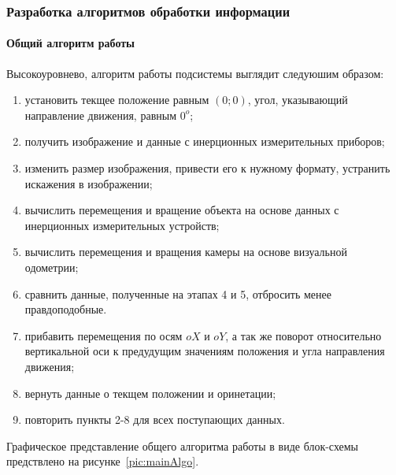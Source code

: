 \subsubsection{Разработка алгоритмов обработки информации}
\paragraph{Общий алгоритм работы}

Высокоуровнево, алгоритм работы подсистемы выглядит следуюшим образом:
\begin{enumerate}
\item установить текщее положение равным $(0; 0)$, угол, указывающий направление движения, равным $0^{o}$;
\item получить изображение и данные с инерционных измерительных приборов;
\item изменить размер изображения, привести его к нужному формату, устранить искажения в изображении;
\item вычислить перемещения и вращение объекта на основе данных с инерционных измерительных устройств;
\item вычислить перемещения и вращения камеры на основе визуальной одометрии;
\item сравнить данные, полученные на этапах 4 и 5, отбросить менее правдоподобные.
\item прибавить перемещения по осям $oX$ и $oY$, а так же поворот относительно вертикальной оси к предудущим значениям положения и угла направления движения;
\item вернуть данные о текщем положении и оринетации;
\item повторить пункты 2-8 для всех поступающих данных.
\end{enumerate}

Графическое представление общего алгоритма работы в виде блок-схемы предствлено на рисунке~\ref{pic:mainAlgo}.


